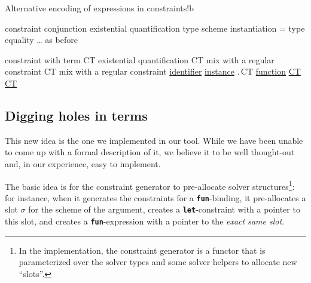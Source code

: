 \documentclass[10pt,a4paper,twoside,titlepage,twocolumn]{article}
\newcommand{\code}[1]{\textbf{\texttt{#1}}}
\begin{document}
\begin{TTCOMPONENT}{Alternative encoding of expressions in constraints\label{fig:bad_idea}}{!b}
  \let \\ \TTSyntaxAlternative%

         {constraint} \\
  {\co \wedge \co}                     {conjunction} \\
  {\cexists\tvars\co}                  {existential quantification} \\
  {\ccall\evid\ttyp}                   {type scheme instantiation}\\
  {\ttyp = \ttyp}                      {type equality} \\
  {…}                                  {as before}

  \columnbreak %

       {constraint with term} \\
  {\cexists\tvars CT}                  {existential quantification} \\
  {CT \wedge\co}                  {mix with a regular constraint} \\
  {\co\wedge CT}                  {mix with a regular constraint} \\
  {\underline{\evid}}                  {\underline{identifier}} \\
  {\ccall{\underline{\evid}}\ttyp}                  {\underline{instance}} \\
  {\underline{\efun\evar\ttyp}.\,CT}                  {\underline{function}} \\
  {\underline{CT}\,\,\underline{CT}} {\underline{}} \\
  {\underline{}} {\underline{\smash{\code{let}-binding}}}

  \extraspacehack{.07in}
\end{TTCOMPONENT}

\subsection{Digging holes in terms}

This new idea is the one we implemented in our tool. While we have been unable
to come up with a formal description of it, we believe it to be well thought-out
and, in our experience, easy to implement.

The basic idea is for the constraint generator to pre-allocate solver
structures\footnote{In the implementation, the constraint generator is a functor
that is parameterized over the solver types and some solver helpers to allocate
new ``slots''.}: for instance, when it generates the constraints for a
\code{fun}-binding, it pre-allocates a slot $\sigma$ for the scheme of the
argument, creates a \code{let}-constraint with a pointer to this slot, and
creates a \code{fun}-expression with a pointer to the \emph{exact same slot}.
\end{document}
